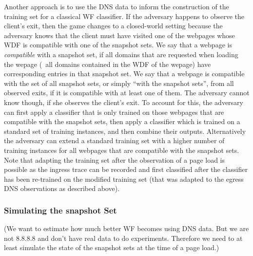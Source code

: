 Another approach is to use the DNS data to inform the construction of
the training set for a classical WF classifier.
%
If the adversary happens to observe the client's exit, then the game
changes to a closed-world setting because the adversary knows that the
client must have visited one of the webpages whose WDF is compatible
with one of the snapshot sets.
%
We say that a webpage is \emph{compatible} with a snapshot set, if all
domains that are requested when loading the wepage (\ie~all domains
contained in the WDF of the wepage) have corresponding entries in that
snapshot set. We say that a webpage is compatible with the set of all
snapshot sets, or simply ``with the snapshot sets'', from all observed
exits, if it is compatible with at least one of them. 
%
The adversary cannot know though, if she observes the client's exit. 
%
To account for this, the adversary can first apply a classifier that is
only trained on those webpages that are compatible with the snapshot
sets, then apply a classifier which is trained on a standard set of
training instances, and then combine their outputs.
%
Alternatively the adversary can extend a standard training set with a
higher number of training instances for all webpages that are compatible
with the snapshot sets.
%
Note that adapting the training set after the observation of a page load
is possible as the ingress trace can be recorded and first classified
after the classifier has been re-trained on the modified training set
(that was adapted to the egress DNS observations as described above).


\subsubsection{Simulating the snapshot Set}
(We want to estimate how much better WF becomes using DNS data. But we
are not 8.8.8.8 and don't have real data to do experiments. Therefore we
need to at least simulate the state of the snapshot sets at the time of
a page load.) %

